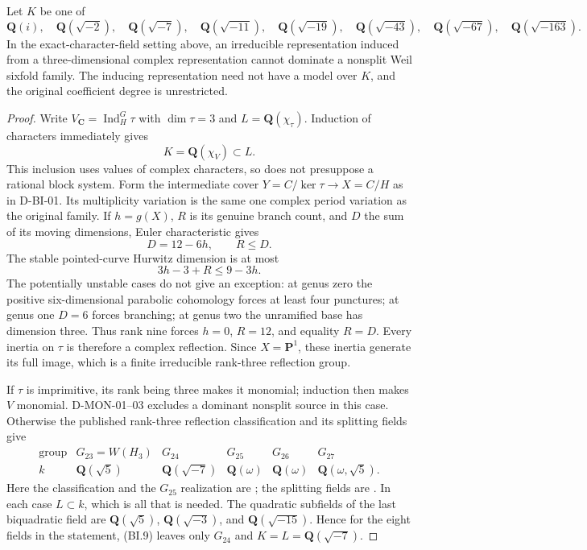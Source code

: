 \begin{theorem}
\label{D-BI-05}
Let $K$ be one of
\[
 \mathbf Q(i),\quad \mathbf Q(\sqrt{-2}),\quad
 \mathbf Q(\sqrt{-7}),\quad\mathbf Q(\sqrt{-11}),\quad
 \mathbf Q(\sqrt{-19}),\quad\mathbf Q(\sqrt{-43}),\quad
 \mathbf Q(\sqrt{-67}),\quad\mathbf Q(\sqrt{-163}).
\]
In the exact-character-field setting above, an irreducible
representation induced from a three-dimensional complex representation
cannot dominate a nonsplit Weil sixfold family.  The inducing
representation need not have a model over $K$, and the original
coefficient degree is unrestricted.
\end{theorem}
\begin{proof}
Write $V_{\mathbf C}=\operatorname{Ind}_H^G\tau$ with
$\dim\tau=3$ and $L=\mathbf Q(\chi_\tau)$.  Induction of
characters immediately gives
\[
                         K=\mathbf Q(\chi_V)\subset L.
\tag{BI.9}
\]
This inclusion uses values of complex characters, so does not
presuppose a rational block system.  Form the intermediate cover
$Y=C/\ker\tau\to X=C/H$ as in D-BI-01.  Its multiplicity variation
is the same one complex period variation as the original family.
If $h=g(X)$, $R$ is its genuine branch count, and $D$ the sum of
its moving dimensions, Euler characteristic gives
\[
                   D=12-6h,\qquad R\le D.
\]
The stable pointed-curve Hurwitz dimension is at most
\[
                    3h-3+R\le9-3h.
\tag{BI.10}
\]
The potentially unstable cases do not give an exception: at genus
zero the positive six-dimensional parabolic cohomology forces at
least four punctures; at genus one $D=6$ forces branching; at genus
two the unramified base has dimension three.  Thus rank nine forces
$h=0$, $R=12$, and equality $R=D$.  Every inertia on $\tau$ is
therefore a complex reflection.  Since $X=\mathbf P^1$, these
inertia generate its full image, which is a finite irreducible
rank-three reflection group.

If $\tau$ is imprimitive, its rank being three makes it monomial;
induction then makes $V$ monomial.  D-MON-01--03 excludes a
dominant nonsplit source in this case.  Otherwise the published
rank-three reflection classification and its splitting fields give
\[
\begin{array}{c|ccccc}
\text{group}&G_{23}=W(H_3)&G_{24}&G_{25}&G_{26}&G_{27}\\ \hline
k&\mathbf Q(\sqrt5)&\mathbf Q(\sqrt{-7})&
 \mathbf Q(\omega)&\mathbf Q(\omega)&
 \mathbf Q(\omega,\sqrt5).
\end{array}
\tag{BI.11}
\]
Here the classification and the $G_{25}$ realization are
\cite[\S4.16, p.~412; Theorem~5.12, p.~435]{FIELD:Cohen};
the splitting fields are \cite[Table~8.2, p.~675, with its
omission convention on p.~676]{FIELD:Malle}.  In each case
$L\subset k$, which is all that is needed.  The quadratic
subfields of the last biquadratic field are
$\mathbf Q(\sqrt5)$, $\mathbf Q(\sqrt{-3})$, and
$\mathbf Q(\sqrt{-15})$.  Hence for the eight fields in the
statement, (BI.9) leaves only $G_{24}$ and
$K=L=\mathbf Q(\sqrt{-7})$.


\end{proof}
